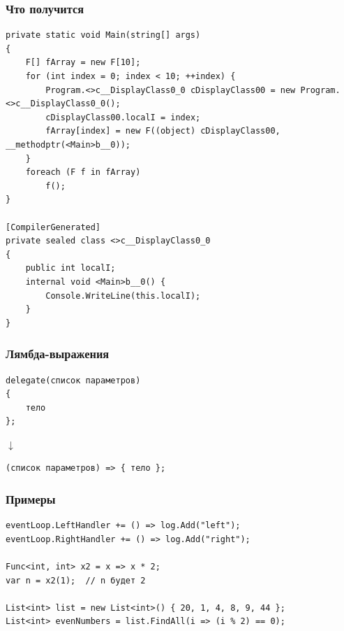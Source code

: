 \documentclass{../../slides-style}
\begin{document}
    \begin{frame}[fragile]
        \frametitle{Что получится}
        \begin{scriptsize}
            \begin{verbatim}
private static void Main(string[] args)
{
    F[] fArray = new F[10];
    for (int index = 0; index < 10; ++index) {
        Program.<>c__DisplayClass0_0 cDisplayClass00 = new Program.<>c__DisplayClass0_0();
        cDisplayClass00.localI = index;
        fArray[index] = new F((object) cDisplayClass00, __methodptr(<Main>b__0));
    }
    foreach (F f in fArray)
        f();
}

[CompilerGenerated]
private sealed class <>c__DisplayClass0_0
{
    public int localI;
    internal void <Main>b__0() {
        Console.WriteLine(this.localI);
    }
}
            \end{verbatim}
        \end{scriptsize}
    \end{frame}

    \begin{frame}[fragile]
        \frametitle{Лямбда-выражения}
        \begin{verbatim}
delegate(список параметров)
{
    тело
};
        \end{verbatim}
        \hspace{2cm}\begin{LARGE}$\downarrow$\end{LARGE}
        \begin{verbatim}
(список параметров) => { тело };
        \end{verbatim}
    \end{frame}

    \begin{frame}[fragile]
        \frametitle{Примеры}
        \begin{verbatim}
eventLoop.LeftHandler += () => log.Add("left");
eventLoop.RightHandler += () => log.Add("right");

Func<int, int> x2 = x => x * 2;
var n = x2(1);  // n будет 2

List<int> list = new List<int>() { 20, 1, 4, 8, 9, 44 };
List<int> evenNumbers = list.FindAll(i => (i % 2) == 0);
        \end{verbatim}
    \end{frame}
\end{document}
